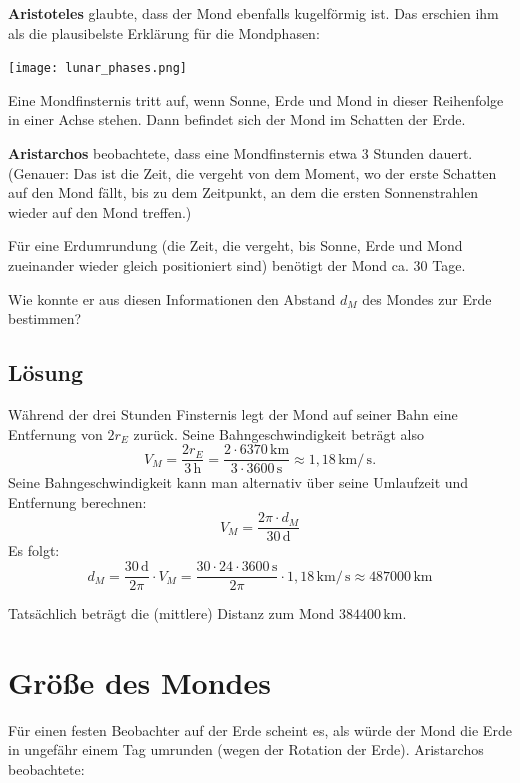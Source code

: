 \documentclass{scrartcl}
\newcommand{\RE}{r_E} %
\newcommand{\DM}{d_M} %
\newcommand{\VM}{V_M} %
\newcommand{\person}[1]{\textbf{#1}} %
\newcommand{\km}{\,\mathrm{km}} %
\newcommand{\hour}{\,\mathrm{h}} %
\newcommand{\seco}{\,\mathrm{s}} %
\newcommand{\days}{\,\mathrm{d}} %
\begin{document}
  \person{Aristoteles} glaubte, dass der Mond ebenfalls kugelförmig ist.
  Das erschien ihm als die plausibelste Erklärung für die Mondphasen:

  \begin{center}
    \texttt{[image: lunar\_phases.png]}
  \end{center}

  Eine Mondfinsternis tritt auf, wenn Sonne, Erde und Mond in dieser Reihenfolge in einer Achse stehen. Dann befindet sich der Mond im Schatten der Erde.

  \person{Aristarchos} beobachtete, dass eine Mondfinsternis etwa 3 Stunden dauert. (Genauer: Das ist die Zeit, die vergeht von dem Moment, wo der erste Schatten auf den Mond fällt, bis zu dem Zeitpunkt, an dem die ersten Sonnenstrahlen wieder auf den Mond treffen.)

  Für eine Erdumrundung (die Zeit, die vergeht, bis Sonne, Erde und Mond zueinander wieder gleich positioniert sind) benötigt der Mond ca. 30 Tage.

  Wie konnte er aus diesen Informationen den Abstand $\DM$ des Mondes zur Erde bestimmen?

  \newpage
  \subsection{Lösung}

  Während der drei Stunden Finsternis legt der Mond auf seiner Bahn eine Entfernung von $2 \RE$ zurück. Seine Bahngeschwindigkeit beträgt also
  \[ \VM = \frac{2 \RE}{3 \hour} = \frac{2 \cdot 6370 \km}{3 \cdot 3600 \seco} \approx 1,18 \km / \seco. \]
  Seine Bahngeschwindigkeit kann man alternativ über seine Umlaufzeit und Entfernung berechnen:
  \[ \VM = \frac{2\pi \cdot \DM}{30 \days} \]
  Es folgt:
  \[ \DM = \frac{30 \days}{2 \pi} \cdot \VM = \frac{30 \cdot 24 \cdot 3600 \seco}{2 \pi} \cdot 1,18 \km / \seco \approx 487000 \km \]

  Tatsächlich beträgt die (mittlere) Distanz zum Mond $384400 \km$.

  \newpage
  \section{Größe des Mondes}

  Für einen festen Beobachter auf der Erde scheint es, als würde der Mond die Erde in ungefähr einem Tag umrunden (wegen der Rotation der Erde). Aristarchos beobachtete:
\end{document}
